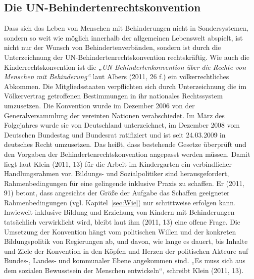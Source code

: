 \subsection{Die UN-Behindertenrechtskonvention}
\label{sec:BRK}
Dass sich das Leben von Menschen mit Behinderungen nicht in Sondersystemen, sondern so weit wie möglich innerhalb der allgemeinen Lebenswelt abspielt, ist nicht nur der Wunsch von Behindertenverbänden, sondern ist durch die Unterzeichnung der UN-Behindertenrechtskonvention rechtskräftig. Wie auch die Kinderrechtskonvention ist die \emph{„UN-Behindertenkonvention über die Rechte von Menschen mit Behinderung“} laut Albers (2011, 26 f.) ein völkerrechtliches Abkommen. Die Mitgliedsstaaten verpflichten sich durch Unterzeichnung die im Völkervertrag getroffenen Bestimmungen in ihr nationales Rechtssystem umzusetzen. Die Konvention wurde im Dezember 2006 von der Generalversammlung der vereinten Nationen verabschiedet. Im März des Folgejahres wurde sie von Deutschland unterzeichnet, im Dezember 2008 vom Deutschen Bundestag und Bundesrat ratifiziert und ist seit 24.03.2009 in deutsches Recht umzusetzen. Das heißt, dass bestehende Gesetze überprüft und den Vorgaben der Behindertenrechtskonvention angepasst werden müssen. Damit liegt laut Klein (2011, 13) für die Arbeit im Kindergarten ein verbindlicher Handlungsrahmen vor. Bildungs- und Sozialpolitiker sind herausgefordert, Rahmenbedingungen für eine gelingende inklusive Praxis zu schaffen. Er (2011, 91) betont, dass angesichts der Größe der Aufgabe das Schaffen geeigneter Rahmenbedingungen (vgl. Kapitel~\ref{sec:Wie}) nur schrittweise erfolgen kann. Inwieweit inklusive Bildung und Erziehung von Kindern mit Behinderungen tatsächlich verwirklicht wird, bleibt laut ihm (2011, 13) eine offene Frage. Die Umsetzung der Konvention hängt vom politischen Willen und der konkreten Bildungspolitik von Regierungen ab, und davon, wie lange es dauert, bis Inhalte und Ziele der Konvention in den Köpfen und Herzen der politischen Akteure auf Bundes-, Landes- und kommunaler Ebene angekommen sind. „Es muss sich aus dem sozialen Bewusstsein der Menschen entwickeln“, schreibt Klein (2011, 13). 

